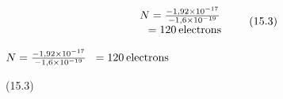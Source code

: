 {\begin{mdframed}[linewidth=4, leftmargin=40, rightmargin=40]
\begin{exercise}
\begin{enumerate}[noitemsep, label=\textbf{Step} \textbf{\arabic*}. ]
{\begin{equation}
    \begin{array}{ccc}N=\frac{-1,92\ensuremath{\times}{10}^{-17}}{-1,6\ensuremath{\times}{10}^{-19}}\\ \phantom{x}=120\phantom{\rule{2pt}{0ex}}\mathrm{electrons}\end{array}\tag{15.3}
      \end{equation}
    }{%
    \setlength{\mymathboxwidth}{\columnwidth}
      \addtolength{\mymathboxwidth}{-48pt}
    \par\vspace{12pt}\noindent\begin{minipage}{\columnwidth}
    \parbox[t]{\mymathboxwidth}{\large\begin{math}
    N=\frac{-1,92\ensuremath{\times}{10}^{-17}}{-1,6\ensuremath{\times}{10}^{-19}}\phantom{x}=120\phantom{\rule{2pt}{0ex}}\mathrm{electrons}\end{math}}\hfill
    \parbox[t]{48pt}{\raggedleft 
    (15.3)}
    \end{minipage}\vspace{12pt}\par
    }%
    \end{enumerate}
        


    \end{exercise}
    \end{mdframed}
    }
    \noindent
  \par
            \label{m38781*eip-409}\vspace{.5cm} 
      
